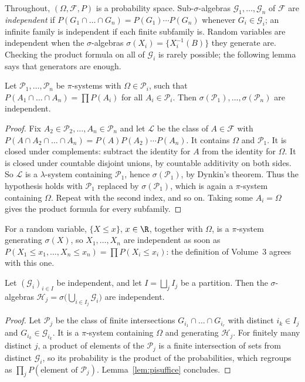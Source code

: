 Throughout, $(\Omega,\mathcal F,P)$ is a probability space. Sub-$\sigma$-algebras $\mathcal G_1,\dots,\mathcal G_n$ of
$\mathcal F$ are \emph{independent} if $P(G_1\cap\dots\cap G_n)=P(G_1)\cdots P(G_n)$ whenever $G_i\in\mathcal G_i$; an
infinite family is independent if each finite subfamily is. Random variables are independent when the $\sigma$-algebras
$\sigma(X_i)=\{X_i^{-1}(B)\}$ they generate are. Checking the product formula on all of $\mathcal G_i$ is rarely possible;
the following lemma says that generators are enough.

\begin{lemma}\label{lem:pisuffice}
Let $\mathcal P_1,\dots,\mathcal P_n$ be $\pi$-systems with $\Omega\in\mathcal P_i$, such that $P(A_1\cap\dots\cap A_n)=
\prod P(A_i)$ for all $A_i\in\mathcal P_i$. Then $\sigma(\mathcal P_1),\dots,\sigma(\mathcal P_n)$ are independent.
\end{lemma}
\begin{proof}
Fix $A_2\in\mathcal P_2,\dots,A_n\in\mathcal P_n$ and let $\mathcal L$ be the class of $A\in\mathcal F$ with
$P(A\cap A_2\cap\dots\cap A_n)=P(A)P(A_2)\cdots P(A_n)$. It contains $\Omega$ and $\mathcal P_1$. It is closed under
complements: subtract the identity for $A$ from the identity for $\Omega$. It is closed under countable disjoint unions, by
countable additivity on both sides. So $\mathcal L$ is a $\lambda$-system containing $\mathcal P_1$, hence $\sigma(
\mathcal P_1)$, by Dynkin's theorem. Thus the hypothesis holds with $\mathcal P_1$ replaced by $\sigma(\mathcal P_1)$, which is
again a $\pi$-system containing $\Omega$. Repeat with the second index, and so on. Taking some $A_i=\Omega$ gives the
product formula for every subfamily.
\end{proof}

For a random variable, $\{X\le x\}$, $x\in\R$, together with $\Omega$, is a $\pi$-system generating $\sigma(X)$, so
$X_1,\dots,X_n$ are independent as soon as $P(X_1\le x_1,\dots,X_n\le x_n)=\prod P(X_i\le x_i)$: the definition of Volume~3
agrees with this one.

\begin{proposition}[grouping]\label{prop:grouping}
Let $(\mathcal G_i)_{i\in I}$ be independent, and let $I=\bigsqcup_jI_j$ be a partition. Then the $\sigma$-algebras
$\mathcal H_j=\sigma\bigl(\bigcup_{i\in I_j}\mathcal G_i\bigr)$ are independent.
\end{proposition}
\begin{proof}
Let $\mathcal P_j$ be the class of finite intersections $G_{i_1}\cap\dots\cap G_{i_r}$ with distinct $i_k\in I_j$ and
$G_{i_k}\in\mathcal G_{i_k}$. It is a $\pi$-system containing $\Omega$ and generating $\mathcal H_j$. For finitely many
distinct $j$, a product of elements of the $\mathcal P_j$ is a finite intersection of sets from distinct $\mathcal G_i$, so
its probability is the product of the probabilities, which regroups as $\prod_jP(\text{element of }\mathcal P_j)$. Lemma~\ref{lem:pisuffice}
 concludes.
\end{proof}

